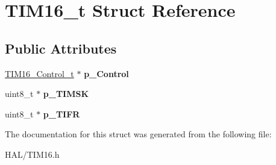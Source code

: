 \hypertarget{struct_t_i_m16__t}{}\section{T\+I\+M16\+\_\+t Struct Reference}
\label{struct_t_i_m16__t}
\subsection*{Public Attributes}
\begin{DoxyCompactItemize}
\item 
\mbox{\label{struct_t_i_m16__t_a1644450769be298ce8715bf070412366}} 
\mbox{\hyperlink{struct_t_i_m16___control__t}{T\+I\+M16\+\_\+\+Control\+\_\+t}} $\ast$ {\bfseries p\+\_\+\+Control}
\item 
\mbox{\label{struct_t_i_m16__t_a384f5023e26ddbb0efe38cdce578e83e}} 
uint8\+\_\+t $\ast$ {\bfseries p\+\_\+\+T\+I\+M\+SK}
\item 
\mbox{\label{struct_t_i_m16__t_a90ff2f89c3f105de4daa8e085c7a9204}} 
uint8\+\_\+t $\ast$ {\bfseries p\+\_\+\+T\+I\+FR}
\end{DoxyCompactItemize}


The documentation for this struct was generated from the following file\+:\begin{DoxyCompactItemize}
\item 
H\+A\+L/T\+I\+M16.\+h\end{DoxyCompactItemize}
